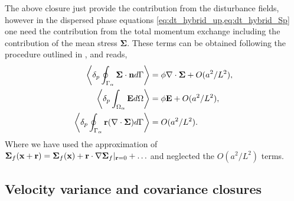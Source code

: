 The above closure just provide the contribution from the disturbance fields, however in the dispersed phase equations \eqref{eq:dt_hybrid_up,eq:dt_hybrid_Sp} one need the contribution from the total momentum exchange including the contribution of the mean stress $\bm\Sigma$. 
These terms can be obtained following the procedure outlined in \citep{zhang1997momentum,morel2015mathematical}, and reads, 
\begin{align}
    \pSavg{\bm\Sigma\cdot \textbf{n}}
    &= \phi\div\bm\Sigma + O(a^2/L^2),\\
    \pOavg{\textbf{E}}
    &= \phi \textbf{E}+ O(a^2/L^2),\\
    \pSavg{\textbf{r}(\div \bm\Sigma)}
    &= O(a^2/L^2). 
    \label{eq:mean_contributions}
\end{align}
Where we have used the approximation of $\bm\Sigma_f(\textbf{x}+\textbf{r}) = \bm\Sigma_f(\textbf{x}) + \textbf{r}\cdot\mathbf{\nabla} \bm\Sigma_f|_{\textbf{r}=0} + \ldots$ and neglected the $O(a^2/L^2)$ terms. 


\subsection{Velocity variance and covariance closures}


